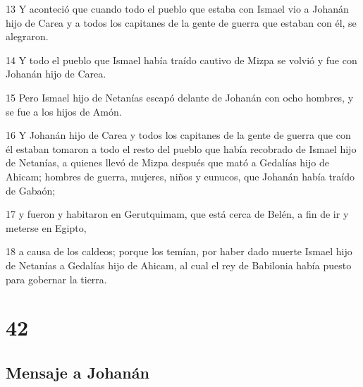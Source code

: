 \par 13 Y aconteció que cuando todo el pueblo que estaba con Ismael vio a Johanán hijo de Carea y a todos los capitanes de la gente de guerra que estaban con él, se alegraron.
\par 14 Y todo el pueblo que Ismael había traído cautivo de Mizpa se volvió y fue con Johanán hijo de Carea.
\par 15 Pero Ismael hijo de Netanías escapó delante de Johanán con ocho hombres, y se fue a los hijos de Amón.
\par 16 Y Johanán hijo de Carea y todos los capitanes de la gente de guerra que con él estaban tomaron a todo el resto del pueblo que había recobrado de Ismael hijo de Netanías, a quienes llevó de Mizpa después que mató a Gedalías hijo de Ahicam; hombres de guerra, mujeres, niños y eunucos, que Johanán había traído de Gabaón;
\par 17 y fueron y habitaron en Gerutquimam, que está cerca de Belén, a fin de ir y meterse en Egipto,
\par 18 a causa de los caldeos; porque los temían, por haber dado muerte Ismael hijo de Netanías a Gedalías hijo de Ahicam, al cual el rey de Babilonia había puesto para gobernar la tierra.

\chapter{42}

\section*{Mensaje a Johanán}

